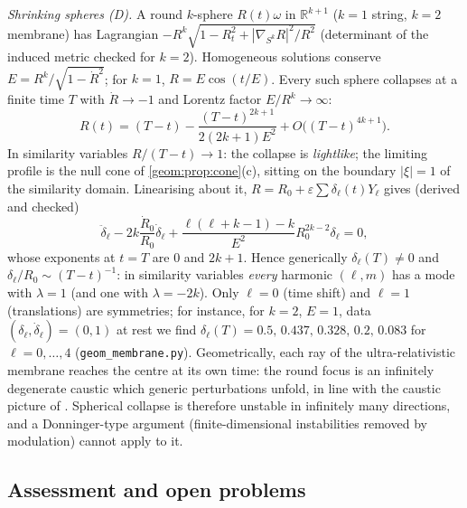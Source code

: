 \emph{Shrinking spheres (D).} A round $k$-sphere $R(t)\omega$ in
$\mathbb{R}^{k+1}$ ($k=1$ string, $k=2$ membrane) has Lagrangian
$-R^k\sqrt{1-R_t^2+|\nabla_{S^k}R|^2/R^2}$ (determinant of the induced metric
checked for $k=2$). Homogeneous solutions conserve
$E=R^k/\sqrt{1-\dot R^2}$; for $k=1$, $R=E\cos(t/E)$. Every such sphere
collapses at a finite time $T$ with $\dot R\to-1$ and Lorentz factor
$E/R^k\to\infty$:
\[
  R(t)=(T-t)-\frac{(T-t)^{2k+1}}{2(2k+1)E^2}+O\bigl((T-t)^{4k+1}\bigr).
\]
In similarity variables $R/(T-t)\to1$: the collapse is \emph{lightlike}; the
limiting profile is the null cone of \cref{geom:prop:cone}(c), sitting on the
boundary $|\xi|=1$ of the similarity domain. Linearising about it,
$R=R_0+\varepsilon\sum\delta_{\ell}(t)Y_{\ell}$ gives (derived and checked)
\begin{equation}\label{geom:eq:sphere-lin}
  \ddot\delta_\ell-2k\frac{\dot R_0}{R_0}\dot\delta_\ell
  +\frac{\ell(\ell+k-1)-k}{E^2}R_0^{2k-2}\delta_\ell=0 ,
\end{equation}
whose exponents at $t=T$ are $0$ and $2k+1$. Hence generically
$\delta_\ell(T)\ne0$ and $\delta_\ell/R_0\sim(T-t)^{-1}$: in similarity
variables \emph{every} harmonic $(\ell,m)$ has a mode with $\lambda=1$ (and
one with $\lambda=-2k$). Only $\ell=0$ (time shift) and $\ell=1$
(translations) are symmetries; for instance, for $k=2$, $E=1$, data
$(\delta_\ell,\dot\delta_\ell)=(0,1)$ at rest we find
$\delta_\ell(T)=0.5,\,0.437,\,0.328,\,0.2,\,0.083$ for $\ell=0,\dots,4$
(\texttt{geom\_membrane.py}). Geometrically, each ray of the
ultra-relativistic membrane reaches the centre at its own time: the round
focus is an infinitely degenerate caustic which generic perturbations
unfold, in line with the caustic picture of \cite{EggersEtAl2015}. Spherical
collapse is therefore unstable in infinitely many directions, and a
Donninger-type argument (finite-dimensional instabilities removed by
modulation) cannot apply to it.

\subsection{Assessment and open problems}
\label{geom:sec:assess}

